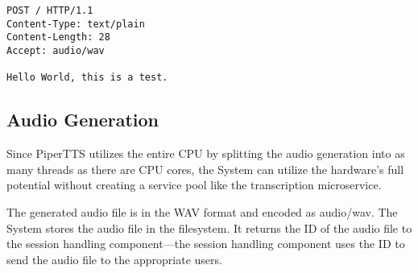 \begin{verbatim}
POST / HTTP/1.1
Content-Type: text/plain
Content-Length: 28
Accept: audio/wav

Hello World, this is a test.

\end{verbatim}

\subsection{Audio Generation}

Since PiperTTS utilizes the entire CPU by splitting the audio generation into as many threads as there are CPU cores, 
the System can utilize the hardware's full potential without creating a service pool like the transcription 
microservice.

The generated audio file is in the WAV format and encoded as audio/wav. The System stores the audio file in the 
filesystem. It returns the ID of the audio file to the session handling component—the session handling component uses 
the ID to send the audio file to the appropriate users. 

